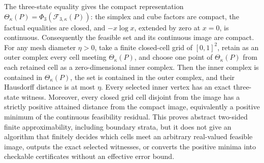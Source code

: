 The three-state equality gives the compact representation \(\Theta_\kappa(P)=\Phi_3(\mathcal F_{3,\kappa}(P))\): the simplex and cube factors are compact, the factual equalities are closed, and \(-x\log x\), extended by zero at \(x=0\), is continuous.  Consequently the feasible set and its continuous image are compact.  For any mesh diameter \(\eta>0\), take a finite closed-cell grid of \([0,1]^2\), retain as an outer complex every cell meeting \(\Theta_\kappa(P)\), and choose one point of \(\Theta_\kappa(P)\) from each retained cell as a zero-dimensional inner complex.  Then the inner complex is contained in \(\Theta_\kappa(P)\), the set is contained in the outer complex, and their Hausdorff distance is at most \(\eta\).  Every selected inner vertex has an exact three-state witness.  Moreover, every closed grid cell disjoint from the image has a strictly positive attained distance from the compact image, equivalently a positive minimum of the continuous feasibility residual.  This proves abstract two-sided finite approximability, including boundary strata, but it does not give an algorithm that finitely decides which cells meet an arbitrary real-valued feasible image, outputs the exact selected witnesses, or converts the positive minima into checkable certificates without an effective error bound.